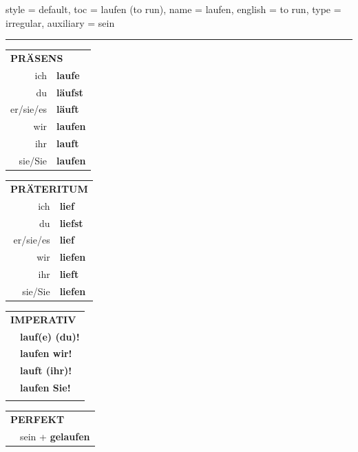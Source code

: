 \begin{verbentry}{
  style = {default},
  toc = {laufen (to run)},
  name = {laufen},
  english = {to run},
  type = {irregular},
  auxiliary = {sein}
}
 
    
     \vspace{5pt}

    \hrule
    
    \vspace{5pt}

  \begin{tabular}{rl}
     \multicolumn{2}{l}{\textbf{PRÄSENS} }\\
    ich & \textbf{laufe}\\
    du & \textbf{läufst}\\
    er/sie/es & \textbf{läuft}\\
    wir & \textbf{laufen}\\
    ihr & \textbf{lauft}\\
    sie/Sie & \textbf{laufen}\\
  \end{tabular}
  \hfill
     \begin{tabular}{rl}
    \multicolumn{2}{l}{\textbf{PRÄTERITUM} }\\
    ich & \textbf{lief}\\
    du & \textbf{liefst}\\
    er/sie/es & \textbf{lief}\\
    wir & \textbf{liefen}\\
    ihr & \textbf{lieft}\\
    sie/Sie & \textbf{liefen}\\
  \end{tabular}
  \hfill
  \begin{tabular}{rl}
     \multicolumn{2}{l}{\textbf{IMPERATIV} }\\
   & \textbf{lauf(e) (du)!}\\
   & \textbf{laufen wir!}\\
   & \textbf{lauft (ihr)!}\\
   & \textbf{laufen Sie!}\\
   & \vspace{10pt}
  \end{tabular}

    \vspace{10pt}

 \begin{tabular}{rl}
     \multicolumn{2}{l}{\textbf{PERFEKT}}\\
  &  sein + \textbf{gelaufen}\\
  \end{tabular}
\hfill
   \begin{tabular}{rl}
   

\end{tabular}
\end{verbentry}
